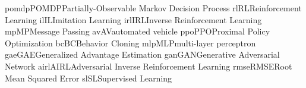    \newacronym
 {pomdp}{POMDP}{Partially-Observable Markov Decision Process}
  \newacronym
 {rl}{RL}{Reinforcement Learning}
  \newacronym
 {il}{IL}{Imitation Learning}
  \newacronym
 {irl}{IRL}{Inverse Reinforcement Learning}
  \newacronym
 {mp}{MP}{Message Passing}
  \newacronym
 {av}{AV}{automated vehicle}
   \newacronym
 {ppo}{PPO}{Proximal Policy Optimization}
   \newacronym
 {bc}{BC}{Behavior Cloning}
   \newacronym
 {mlp}{MLP}{multi-layer perceptron}
   \newacronym
 {gae}{GAE}{Generalized Advantage Estimation}
    \newacronym
 {gan}{GAN}{Generative Adversarial Network}
    \newacronym
 {airl}{AIRL}{Adversarial Inverse Reinforcement Learning}
    \newacronym
 {rmse}{RMSE}{Root Mean Squared Error}
    \newacronym
 {sl}{SL}{Supervised Learning}
